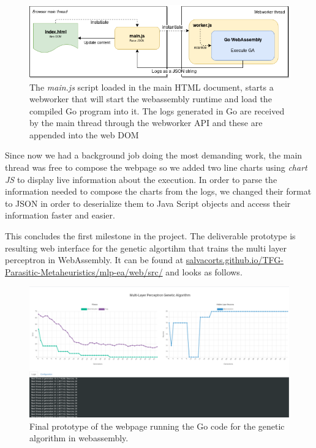 \begin{figure}[h!]
		\centering
    	\includegraphics[width=\linewidth]{assets/images/logging-system.png}
    	\caption{The \textit{main.js} script loaded in the main HTML document, starts a webworker that will start the webassembly runtime and load the compiled Go program into it. The logs generated in Go are received by the main thread through the webworker API and these are appended into the web DOM}
    	\label{image:logging-system}
\end{figure} 

Since now we had a background job doing the most demanding work, the main thread was free to compose the webpage so we added two line charts using \textit{chart JS} to display live information about the execution. In order to parse the information needed to compose the charts from the logs, we changed their format to JSON in order to deserialize them to Java Script objects and access their information faster and easier.

This concludes the first milestone in the project. The deliverable prototype is resulting web interface for the genetic algortihm that trains the multi layer perceptron in WebAssembly. It can be found at \href{https://salvacorts.github.io/TFG-Parasitic-Metaheuristics/mlp-ea/web/src/}{salvacorts.github.io/TFG-Parasitic-Metaheuristics/mlp-ea/web/src/} and looks as follows.

\begin{figure}[h!]
		\centering
    	\includegraphics[width=\linewidth]{assets/images/web-milestone1.png}
    	\caption{Final prototype of the webpage running the Go code for the genetic algorithm in webassembly.}
    	\label{image:web-milestone1}
\end{figure}

